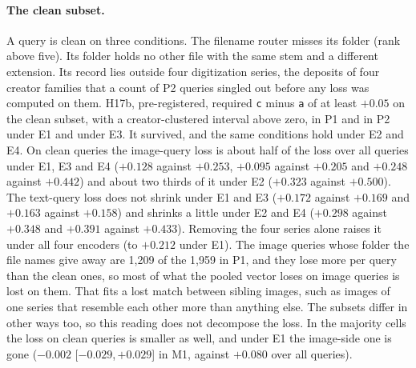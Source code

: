\documentclass[11pt]{article}
\newcommand{\rep}[1]{\texttt{#1}}
\newcommand{\ci}[2]{[\ensuremath{#1},\,\ensuremath{#2}]}  %
\begin{document}
\paragraph{The clean subset.} A query is clean on three conditions. The filename router misses its folder (rank above five). Its folder holds no other file with the same stem and a different extension. Its record lies outside four digitization series, the deposits of four creator families that a count of P2 queries singled out before any loss was computed on them. H17b, pre-registered, required \rep{c} minus \rep{a} of at least $+0.05$ on the clean subset, with a creator-clustered interval above zero, in P1 and in P2 under E1 and under E3. It survived, and the same conditions hold under E2 and E4. On clean queries the image-query loss is about half of the loss over all queries under E1, E3 and E4 ($+0.128$ against $+0.253$, $+0.095$ against $+0.205$ and $+0.248$ against $+0.442$) and about two thirds of it under E2 ($+0.323$ against $+0.500$). The text-query loss does not shrink under E1 and E3 ($+0.172$ against $+0.169$ and $+0.163$ against $+0.158$) and shrinks a little under E2 and E4 ($+0.298$ against $+0.348$ and $+0.391$ against $+0.433$). Removing the four series alone raises it under all four encoders (to $+0.212$ under E1). The image queries whose folder the file names give away are 1,209 of the 1,959 in P1, and they lose more per query than the clean ones, so most of what the pooled vector loses on image queries is lost on them. That fits a lost match between sibling images, such as images of one series that resemble each other more than anything else. The subsets differ in other ways too, so this reading does not decompose the loss. In the majority cells the loss on clean queries is smaller as well, and under E1 the image-side one is gone ($-0.002$ \ci{-0.029}{+0.029} in M1, against $+0.080$ over all queries).
\end{document}
